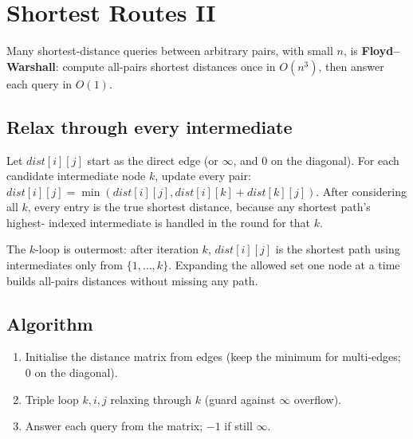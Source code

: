 \section{Shortest Routes II}
\label{sec:cses-shortest-routes-ii}


\begin{patternbox}
Many shortest-distance queries between arbitrary pairs, with small $n$, is
\textbf{Floyd--Warshall}: compute all-pairs shortest distances once in
$O(n^3)$, then answer each query in $O(1)$.
\end{patternbox}

\subsection*{Relax through every intermediate}

Let $\textit{dist}[i][j]$ start as the direct edge (or $\infty$, and $0$ on
the diagonal). For each candidate intermediate node $k$, update every pair:
$\textit{dist}[i][j]=\min(\textit{dist}[i][j],
\textit{dist}[i][k]+\textit{dist}[k][j])$. After considering all $k$, every
entry is the true shortest distance, because any shortest path's highest-
indexed intermediate is handled in the round for that $k$.

\begin{ideabox}
The $k$-loop is outermost: after iteration $k$, $\textit{dist}[i][j]$ is the
shortest path using intermediates only from $\{1,\ldots,k\}$. Expanding the
allowed set one node at a time builds all-pairs distances without missing
any path.
\end{ideabox}

\subsection*{Algorithm}

\begin{enumerate}
  \item Initialise the distance matrix from edges (keep the minimum for
        multi-edges; $0$ on the diagonal).
  \item Triple loop $k,i,j$ relaxing through $k$ (guard against $\infty$
        overflow).
  \item Answer each query from the matrix; $-1$ if still $\infty$.
\end{enumerate}

